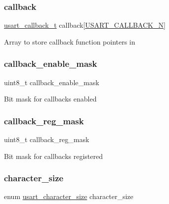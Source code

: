\subsubsection{\texorpdfstring{callback}{callback}}
{\footnotesize\ttfamily \mbox{\hyperlink{group__asfdoc__sam0__sercom__usart__group_ga1d3e2901d0cf76f20aae271f7122c67d}{usart\+\_\+callback\+\_\+t}} callback\mbox{[}\mbox{\hyperlink{group__asfdoc__sam0__sercom__usart__group_ggae257d5c9ac64a6835db020aa2458439dad6e55cb6f0f87b63292fe063d76405b5}{U\+S\+A\+R\+T\+\_\+\+C\+A\+L\+L\+B\+A\+C\+K\+\_\+N}}\mbox{]}}

Array to store callback function pointers in \mbox{\label{structusart__module_afad7acb8781b0158f430dbd3eec23325}} 
\subsubsection{\texorpdfstring{callback\_enable\_mask}{callback\_enable\_mask}}
{\footnotesize\ttfamily uint8\+\_\+t callback\+\_\+enable\+\_\+mask}

Bit mask for callbacks enabled \mbox{\label{structusart__module_aca598a13daa631f2acaf10fd14cddd9b}} 
\subsubsection{\texorpdfstring{callback\_reg\_mask}{callback\_reg\_mask}}
{\footnotesize\ttfamily uint8\+\_\+t callback\+\_\+reg\+\_\+mask}

Bit mask for callbacks registered \mbox{\label{structusart__module_a30702e47861220f8092295e86df57e3b}} 
\subsubsection{\texorpdfstring{character\_size}{character\_size}}
{\footnotesize\ttfamily enum \mbox{\hyperlink{group__asfdoc__sam0__sercom__usart__group_ga631ce7b4f60dccd392e6d6ef7d3cd4e2}{usart\+\_\+character\+\_\+size}} character\+\_\+size}

